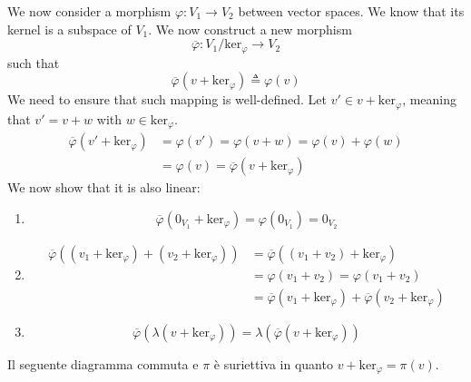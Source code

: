 \documentclass[a4paper]{article}
\begin{document}
We now consider a morphism \(\varphi \colon V_1 \to V_2\)
between vector spaces. We know that its kernel is a subspace of \(V_1\).
We now construct a new morphism
\[
    \overline{\varphi} \colon V_1 / \text{ker}_\varphi \to V_2
\]
such that
\[
    \overline{\varphi}(v + \text{ker}_\varphi) \triangleq \varphi(v)
\]
We need to ensure that such mapping is well-defined.
Let \(v' \in v + \text{ker}_\varphi\), meaning that \(v' = v + w\)
with \(w \in \text{ker}_\varphi\).
\begin{align*}
    \overline{\varphi}(v' + \text{ker}_\varphi)
    &= \varphi(v') = \varphi(v + w) = \varphi(v) + \varphi(w) \\
    &= \varphi(v) = \overline{\varphi}(v + \text{ker}_\varphi)
\end{align*}
We now show that it is also linear:
\begin{enumerate}
    \item \[
            \overline{\varphi}(0_{V_1} + \text{ker}_\varphi) =
            \varphi(0_{V_1}) = 0_{V_2}
        \]
    \item
        \begin{align*}
            \overline{\varphi}((v_1 + \text{ker}_\varphi) + (v_2 +
            \text{ker}_\varphi))
            &= \overline{\varphi}((v_1 + v_2) + \text{ker}_\varphi) \\
            &= \varphi(v_1 + v_2) = \varphi(v_1 + v_2) \\
            &= \overline{\varphi}(v_1 + \text{ker}_\varphi)
            + \overline{\varphi}(v_2 + \text{ker}_\varphi)
        \end{align*}
    \item \[
            \overline{\varphi}(\lambda (v + \text{ker}_\varphi)) =
            \lambda \left(\overline{\varphi}(v + \text{ker}_\varphi)\right)
        \]
\end{enumerate}

Il seguente diagramma commuta e \(\pi\) è suriettiva in quanto
\(v+\text{ker}_\varphi = \pi(v)\).
\end{document}
